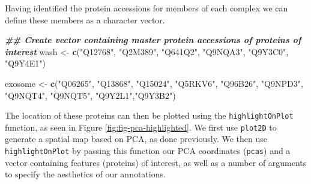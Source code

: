 \documentclass[9pt,a4paper,]{extarticle}
\newenvironment{Shaded}{\begin{snugshade}}{\end{snugshade}}
\newcommand{\DocumentationTok}[1]{\textcolor[rgb]{0.56,0.35,0.01}{\textbf{\textit{#1}}}}
\newcommand{\FunctionTok}[1]{\textcolor[rgb]{0.13,0.29,0.53}{\textbf{#1}}}
\newcommand{\NormalTok}[1]{#1}
\newcommand{\OtherTok}[1]{\textcolor[rgb]{0.56,0.35,0.01}{#1}}
\newcommand{\StringTok}[1]{\textcolor[rgb]{0.31,0.60,0.02}{#1}}
\begin{document}
Having identified the protein accessions for members of each complex we can
define these members as a character vector.

\begin{Shaded}
\begin{Highlighting}[]
\DocumentationTok{\#\# Create vector containing master protein accessions of proteins of interest}
\NormalTok{wash }\OtherTok{\textless{}{-}} \FunctionTok{c}\NormalTok{(}\StringTok{"Q12768"}\NormalTok{, }\StringTok{"Q2M389"}\NormalTok{, }\StringTok{"Q641Q2"}\NormalTok{, }\StringTok{"Q9NQA3"}\NormalTok{, }\StringTok{"Q9Y3C0"}\NormalTok{, }\StringTok{"Q9Y4E1"}\NormalTok{)}

\NormalTok{exosome }\OtherTok{\textless{}{-}} \FunctionTok{c}\NormalTok{(}\StringTok{"Q06265"}\NormalTok{, }\StringTok{"Q13868"}\NormalTok{, }\StringTok{"Q15024"}\NormalTok{, }\StringTok{"Q5RKV6"}\NormalTok{, }\StringTok{"Q96B26"}\NormalTok{,}
             \StringTok{"Q9NPD3"}\NormalTok{, }\StringTok{"Q9NQT4"}\NormalTok{, }\StringTok{"Q9NQT5"}\NormalTok{, }\StringTok{"Q9Y2L1"}\NormalTok{,}\StringTok{"Q9Y3B2"}\NormalTok{)}
\end{Highlighting}
\end{Shaded}

The location of these proteins can then be plotted using the \texttt{highlightOnPlot}
function, as seen in Figure \ref{fig:fig-pca-highlighted}. We first use \texttt{plot2D} to generate a spatial map based on PCA, as done
previously. We then use \texttt{highlightOnPlot} by passing this function our PCA
coordinates (\texttt{pcas}) and a vector containing features (proteins) of interest, as
well as a number of arguments to specify the aesthetics of our annotations.
\end{document}
